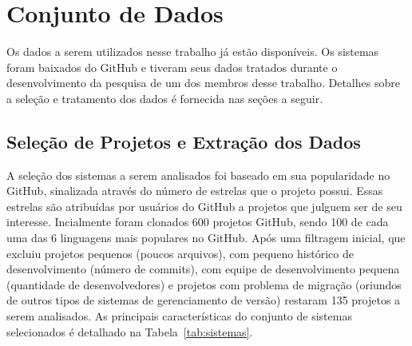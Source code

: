 \documentclass[12pt]{article}
\begin{document}
%

\section{Conjunto de Dados}

Os dados a serem utilizados nesse trabalho já estão disponíveis. Os sistemas foram baixados do GitHub e tiveram seus dados tratados durante o desenvolvimento da pesquisa de um dos membros desse trabalho. Detalhes sobre a seleção e tratamento dos dados é fornecida nas seções a seguir. 

\subsection {Seleção de Projetos e Extração dos Dados}
A seleção dos sistemas a serem analisados foi baseado em sua popularidade no GitHub, sinalizada através do número de estrelas que o projeto possui. Essas estrelas são atribuídas por usuários do GitHub a projetos que julguem ser de seu interesse. Incialmente foram clonados 600 projetos GitHub, sendo 100 de cada uma das 6 linguagens mais populares no GitHub. Após uma filtragem inicial, que excluiu projetos pequenos (poucos arquivos),  com pequeno histórico de desenvolvimento (número de commits), com equipe de desenvolvimento pequena (quantidade de desenvolvedores) e projetos com problema de migração (oriundos de outros tipos de sistemas de gerenciamento de versão) restaram 135 projetos a serem analisados.
As principais características do  conjunto de sistemas selecionados é detalhado na Tabela~\ref{tab:sistemas}.
\end{document}
